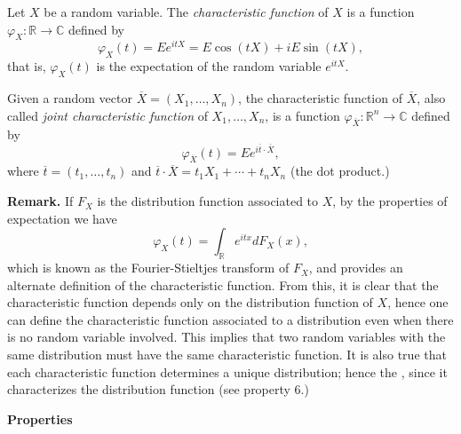 \documentclass[12pt]{article}
\begin{document}
Let $X$ be a random variable. The \emph{characteristic function} of $X$ is a function
$\varphi_X:\mathbb{R}\rightarrow\mathbb{C}$ defined by
\[\varphi_X(t) = Ee^{itX} = E\cos(tX) + iE\sin(tX),\]
that is, $\varphi_X(t)$ is the expectation of the random variable $e^{itX}$.

Given a random vector $\overline{X}=(X_1,\dots,X_n)$, the characteristic function of
$\overline{X}$, also called \emph{joint characteristic function} of $X_1,\dots,X_n$,
is a function $\varphi_{\overline{X}}:\mathbb{R}^n\rightarrow\mathbb{C}$ defined by
\[\varphi_{\overline{X}}(t)=Ee^{i{\overline{t}}\cdot{\overline{X}}},\]
where $\overline{t} = (t_1,\dots,t_n)$ and
${\overline{t}}\cdot{\overline{X}} = t_1X_1+\cdots+t_nX_n$ (the dot product.)

\textbf{Remark.} If $F_X$ is the distribution function associated to $X$, by the
properties of expectation we have
\[\varphi_X(t) = \int_\mathbb{R} e^{itx}dF_X(x),\]
which is known as the Fourier-Stieltjes transform of $F_X$, and provides an alternate
definition of the characteristic function. From this, it is clear that the characteristic
function depends only on the distribution function of $X$, hence one can define the characteristic
function associated to a distribution even when there is no random variable involved.
This implies that two random variables with the same distribution must have the same
characteristic function. It is also true that each characteristic function determines
a unique distribution; hence the , since it characterizes the distribution function (see property 6.)

\textbf{Properties}
\end{document}
